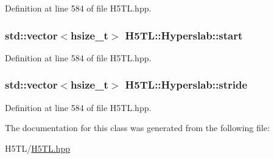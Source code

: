 Definition at line 584 of file H5\-T\-L.\-hpp.

\hypertarget{class_h5_t_l_1_1_hyperslab_ae3087ea27a6ab424547472e6c4a6c531}{
\subsubsection[{start}]{\setlength{\rightskip}{0pt plus 5cm}std\-::vector$<$hsize\-\_\-t$>$ H5\-T\-L\-::\-Hyperslab\-::start\hspace{0.3cm}{\ttfamily [protected]}}}\label{class_h5_t_l_1_1_hyperslab_ae3087ea27a6ab424547472e6c4a6c531}


Definition at line 584 of file H5\-T\-L.\-hpp.

\hypertarget{class_h5_t_l_1_1_hyperslab_a9d67100bbeba66acc2d936da2ffdc79d}{
\subsubsection[{stride}]{\setlength{\rightskip}{0pt plus 5cm}std\-::vector$<$hsize\-\_\-t$>$ H5\-T\-L\-::\-Hyperslab\-::stride\hspace{0.3cm}{\ttfamily [protected]}}}\label{class_h5_t_l_1_1_hyperslab_a9d67100bbeba66acc2d936da2ffdc79d}


Definition at line 584 of file H5\-T\-L.\-hpp.



The documentation for this class was generated from the following file\-:\begin{DoxyCompactItemize}
\item 
H5\-T\-L/\hyperlink{_h5_t_l_8hpp}{H5\-T\-L.\-hpp}\end{DoxyCompactItemize}
